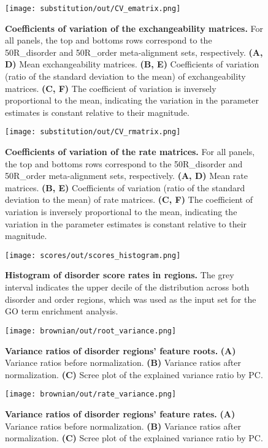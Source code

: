 \begin{figure}[h!]
\texttt{[image: substitution/out/CV\_ematrix.png]}
\centering
\caption{\textbf{Coefficients of variation of the exchangeability matrices.}
For all panels, the top and bottoms rows correspond to the 50R\_disorder and 50R\_order meta-alignment sets, respectively. \textbf{(A, D)} Mean exchangeability matrices. \textbf{(B, E)} Coefficients of variation (ratio of the standard deviation to the mean) of exchangeability matrices. \textbf{(C, F)} The coefficient of variation is inversely proportional to the mean, indicating the variation in the parameter estimates is constant relative to their magnitude.}
\label{sfig:CV_ematrix}
\end{figure}

\begin{figure}[h!]
\texttt{[image: substitution/out/CV\_rmatrix.png]}
\centering
\caption{\textbf{Coefficients of variation of the rate matrices.}
For all panels, the top and bottoms rows correspond to the 50R\_disorder and 50R\_order meta-alignment sets, respectively. \textbf{(A, D)} Mean rate matrices. \textbf{(B, E)} Coefficients of variation (ratio of the standard deviation to the mean) of rate matrices. \textbf{(C, F)} The coefficient of variation is inversely proportional to the mean, indicating the variation in the parameter estimates is constant relative to their magnitude.}
\label{sfig:CV_rmatrix}
\end{figure}

\begin{figure}[h!]
\texttt{[image: scores/out/scores\_histogram.png]}
\centering
\caption{\textbf{Histogram of disorder score rates in regions.}
The grey interval indicates the upper decile of the distribution across both disorder and order regions, which was used as the input set for the GO term enrichment analysis.}
\label{sfig:scores_histogram}
\end{figure}

\begin{figure}[h!]
\texttt{[image: brownian/out/root\_variance.png]}
\centering
\caption{\textbf{Variance ratios of disorder regions' feature roots.}
\textbf{(A)} Variance ratios before normalization. \textbf{(B)} Variance ratios after normalization. \textbf{(C)} Scree plot of the explained variance ratio by PC.}
\label{sfig:root_variance}
\end{figure}

\begin{figure}[h!]
\texttt{[image: brownian/out/rate\_variance.png]}
\centering
\caption{\textbf{Variance ratios of disorder regions' feature rates.}
\textbf{(A)} Variance ratios before normalization. \textbf{(B)} Variance ratios after normalization. \textbf{(C)} Scree plot of the explained variance ratio by PC.}
\label{sfig:rate_variance}
\end{figure}

